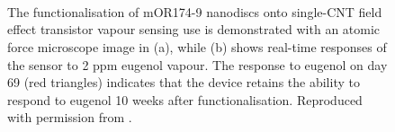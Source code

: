 \documentclass[
  a4paper,
]{scrbook}
\begin{document}
\begin{figure}
\begin{minipage}[t]{0.01\linewidth}
{\centering 

~

}

\end{minipage}%
%
\begin{minipage}[t]{0.03\linewidth}

{\centering 


}

\end{minipage}%
%
\begin{minipage}[t]{0.01\linewidth}

{\centering 

~

}

\end{minipage}%
%
\begin{minipage}[t]{0.50\linewidth}

{\centering 


}

\end{minipage}%
%
\begin{minipage}[t]{0.01\linewidth}

{\centering 

~

}

\end{minipage}%

\caption{\label{fig-eugenol-responses}The functionalisation of mOR174-9
nanodiscs onto single-CNT field effect transistor vapour sensing use is
demonstrated with an atomic force microscope image in (a), while (b)
shows real-time responses of the sensor to 2 ppm eugenol vapour. The
response to eugenol on day 69 (red triangles) indicates that the device
retains the ability to respond to eugenol 10 weeks after
functionalisation. Reproduced with permission from
\autocite{Goldsmith2011}.}

\end{figure}
\end{document}
